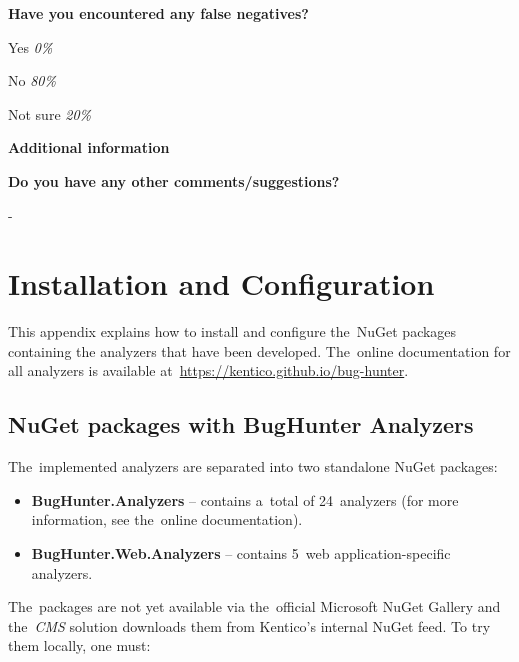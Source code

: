 \documentclass[
  digital, %
  table,   %
  lof,     %
  lot,     %
  oneside,
]{fithesis3}
\begin{document}
\smallskip\noindent
\textbf{Have you encountered any false negatives?}
\begin{compactitem}
\item Yes \textit{0\%}
\item No \textit{80\%}
\item Not sure \textit{20\%}
\end{compactitem}

\begin{center}
\textbf{Additional information}
\end{center}

\smallskip\noindent
\textbf{Do you have any other comments/suggestions?}

-

\chapter{Installation and Configuration}
\label{appendix:deployment}
This appendix explains how to install and configure the~NuGet packages containing the analyzers that have been developed. The~online documentation for all analyzers is available at~\url{https://kentico.github.io/bug-hunter}.


\section{NuGet packages with BugHunter Analyzers}
The~implemented analyzers are separated into two standalone NuGet packages:

\begin{itemize}
\item \textbf{BugHunter.Analyzers} -- contains a~total of 24~analyzers (for more information, see the~online documentation).

\item \textbf{BugHunter.Web.Analyzers} -- contains 5~web application-specific analyzers.
\end{itemize}

The~packages are not yet available via the~official Microsoft NuGet Gallery and the~\textit{CMS} solution downloads them from Kentico's internal NuGet feed. To try them locally, one must:
\end{document}
